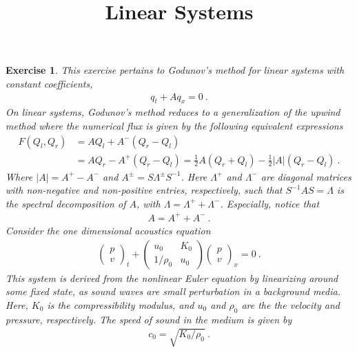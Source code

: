 \documentclass[10pt,letterpaper]{article}
\newcommand{\rb}[1]{ \left(  {#1} \right) }
\newcommand{\frb}[1]{ \left(  {#1} \right) }
\newcommand{\sqb}[1]{ \left(  {#1} \right) }
\theoremstyle{break}
\newtheorem{exercise}{Exercise}
\begin{document}
\title{Linear Systems}
\date{}

\maketitle

















\begin{exercise}


	This exercise pertains to \emph{Godunov's method} for linear systems with constant coefficients,
	\begin{gather} \label{linSys}
		q_{t}+Aq_{x}=0\ .
	\end{gather}%
	On linear systems, Godunov's method reduces to a generalization of the upwind method where the numerical flux is given by the following equivalent expressions 
	\begin{align}%
		F\frb{Q_l,Q_r}
		&=AQ_l+A^{-}\rb{Q_r-Q_l}\\
		&=AQ_r-A^{+}\rb{Q_r-Q_l}
		=\frac{1}{2}A\rb{Q_r+Q_l}-\frac{1}{2}|A|\rb{Q_r-Q_l}\ .
	\end{align}%
	Where $|A|=A^+-A^-$ and $A^{\pm}=S\Lambda^{\pm}S^{-1}$. Here $\Lambda^+$ and $\Lambda^-$ are diagonal matrices with non-negative and non-positive entries, respectively, such that $S^{-1}AS=\Lambda$ is the spectral decomposition of $A$,  with $\Lambda=\Lambda^+ +\Lambda^-$.
	Especially, notice that
	\begin{align}
		A=A^{+}+A^{-}\ .
	\end{align}
	Consider the one dimensional acoustics equation
	\begin{align} \label{AcEq}
		\sqb{ 
			\begin{array}{c} p \\ v \end{array}
		}_{t} 
		+
		\sqb{
			\begin{array}{cc} u_{0} & K_{0} \\ 1/\rho_{0} & u_{0} \end{array}
		}
		\sqb{
			\begin{array}{c} p \\ v \end{array}
		}_{x}=0\ .
	\end{align}%
	This system is derived from the nonlinear Euler equation by linearizing around some fixed state, as sound waves are small perturbation in a background media.
	Here, $K_{0}$ is the compressibility modulus, and $u_{0}$ and $\rho_{0}$ are the the velocity and pressure, respectively.
	The speed of sound in the medium is given by
	\begin{align}
		c_{0}=\sqrt{K_{0}/\rho_{0}}\ .
	\end{align}


\end{exercise}
\end{document}
